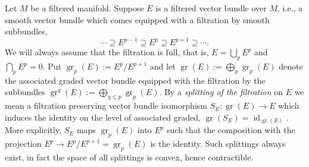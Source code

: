 \documentclass[reqno,12pt]{amsart}
\DeclareMathOperator{\gr}{gr}
\DeclareMathOperator{\id}{id}
\theoremstyle{plain}
\theoremstyle{definition}
\begin{document}
Let $M$ be a filtered manifold.
Suppose $E$ is a filtered vector bundle over $M$, i.e., a smooth vector bundle which comes equipped with a filtration by smooth subbundles,
$$
\cdots\supseteq E^{p-1}\supseteq E^p\supseteq E^{p+1}\supseteq\cdots.
$$ 
We will always assume that the filtration is full, that is, $E=\bigcup_pE^p$ and $\bigcap_pE^p=0$.
Put $\gr_p(E):=E^p/E^{p+1}$ and let $\gr(E):=\bigoplus_p\gr_p(E)$ denote the associated graded vector bundle equipped with the filtration by the subbundles $\gr^q(E):=\bigoplus_{q\leq p}\gr_p(E)$.
By a \emph{splitting of the filtration} on $E$ we mean a filtration preserving vector bundle isomorphism $S_E\colon\gr(E)\to E$ which induces the identity on the level of associated graded, $\gr(S_E)=\id_{\gr(E)}$.
More explicitly, $S_E$ maps $\gr_p(E)$ into $E^p$ such that the composition with the projection $E^p\to E^p/E^{p+1}=\gr_p(E)$ is the identity.
Such splittings always exist, in fact the space of all splittings is convex, hence contractible.
\end{document}
